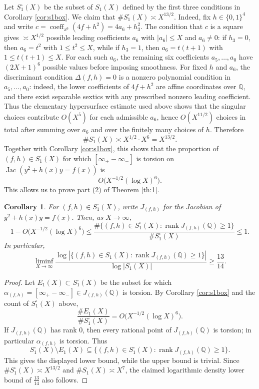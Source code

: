 \documentclass{amsart}
\newtheorem{corollary}[proposition]{Corollary}
\begin{document}
Let \(S_1^\square(X)\) be the subset of \(S_1(X)\) defined by the first three
conditions in Corollary \ref{cor:s1box}. We claim that
$\#S_1^\square(X)\asymp X^{13/2}$.
Indeed, fix \(h\in\{0,1\}^4\) and write $
c=\operatorname{coeff}_{x^6}(4f+h^2)=4a_6+h_3^2$.
The condition that \(c\) is a square gives \(\asymp X^{1/2}\) possible leading
coefficients \(a_6\) with \(|a_6|\le X\) and \(a_6\ne 0\): if \(h_3=0\), then
\(a_6=t^2\) with \(1\le t^2\le X\), while if \(h_3=1\), then
\(a_6=t(t+1)\) with \(1\le t(t+1)\le X\). For each such \(a_6\), the remaining
six coefficients \(a_5,\ldots,a_0\) have \((2X+1)^6\) possible values before
imposing smoothness. For fixed \(h\) and \(a_6\), the discriminant condition
\(\Delta(f,h)=0\) is a nonzero polynomial condition in \(a_5,\ldots,a_0\): indeed,
the lower coefficients of \(4f+h^2\) are affine coordinates over \(\mathbb Q\),
and there exist separable sextics with any prescribed nonzero leading coefficient.
Thus the elementary hypersurface estimate used above shows that the singular
choices contribute \(O(X^5)\) for each admissible \(a_6\), hence
\(O(X^{11/2})\) choices in total after summing over \(a_6\) and over the finitely
many choices of \(h\). Therefore
\[
\#S_1^\square(X)\asymp X^{1/2}\cdot X^6=X^{13/2}.
\]
Together with Corollary \ref{cor:s1box}, this shows that the proportion of
\((f,h)\in S_1^\square(X)\) for which \([\infty_+-\infty_-]\) is torsion on
\(\operatorname{Jac}(y^2+h(x)y=f(x))\) is
\[
O\bigl(X^{-1/2}(\log X)^6\bigr).
\]
This allows us to prove part (2) of Theorem \ref{th:1}.

\begin{corollary} \label{cor:3} For \((f,h)\in S_1^\square(X)\), write \(J_{(f,h)}\)
for the Jacobian of \(y^2+h(x)y=f(x)\). Then, as \(X\to\infty\),
\[
1-O\bigl(X^{-1/2}(\log X)^6\bigr)
\le
\frac{\#\{(f,h)\in S_1^\square(X): \operatorname{rank} J_{(f,h)}(\mathbb Q)\ge 1\}}
{\#S_1^\square(X)}
\le 1.
\]
In particular,
\[
\liminf_{X\to\infty}
\frac{
\log \left|\{(f,h)\in S_1(X): \operatorname{rank} J_{(f,h)}(\mathbb Q)\ge 1\}\right|
}
{\log |S_1(X)|}
\ge \frac{13}{14}.
\]
\end{corollary}
\begin{proof}
Let \(E_1(X)\subset S_1^\square(X)\) be the subset for which
\(\alpha_{(f,h)}=[\infty_+-\infty_-]\in J_{(f,h)}(\mathbb Q)\) is torsion. By
Corollary \ref{cor:s1box} and the count of \(S_1^\square(X)\) above,
\[
\frac{\#E_1(X)}{\#S_1^\square(X)}
=O\bigl(X^{-1/2}(\log X)^6\bigr).
\]
If \(J_{(f,h)}(\mathbb Q)\) has rank \(0\), then every rational point of
\(J_{(f,h)}(\mathbb Q)\) is torsion; in particular \(\alpha_{(f,h)}\) is torsion.
Thus
\[
S_1^\square(X)\setminus E_1(X)
\subseteq
\{(f,h)\in S_1^\square(X): \operatorname{rank}J_{(f,h)}(\mathbb Q)\ge 1\}.
\]
This gives the displayed lower bound, while the upper bound is trivial. Since
\(\#S_1^\square(X)\asymp X^{13/2}\) and \(\#S_1(X)\asymp X^7\), the claimed logarithmic
density lower bound of \(\frac{13}{14}\) also follows.
\end{proof}
\end{document}
